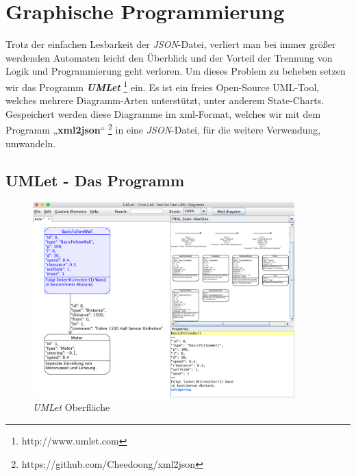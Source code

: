 \section{Graphische Programmierung}
\label{sec:graphischeprogrammierung}

Trotz der einfachen Lesbarkeit der \textit{JSON}-Datei, verliert man bei immer größer
werdenden Automaten leicht den Überblick und der Vorteil der Trennung von Logik
und Programmierung geht verloren. Um dieses Problem zu beheben setzen wir das
Programm \textbf{\textit{UMLet}} \footnote[1]{http://www.umlet.com} ein. Es ist ein freies Open-Source UML-Tool, welches mehrere
Diagramm-Arten unterstützt, unter anderem State-Charts. Gespeichert werden
diese Diagramme im xml-Format, welches wir mit dem Programm „\textbf{xml2json}“ \footnote[2]{https://github.com/Cheedoong/xml2json}
in eine \textit{JSON}-Datei, für die weitere Verwendung, umwandeln.
\subsection{UMLet - Das Programm}
\begin{figure}[ht]
\centering 
\includegraphics[width=0.90\textwidth]{images/umlet-bsp.png} 
\caption{\textit{UMLet} Oberfläche}
\label{fig:umlet}
\end{figure}

